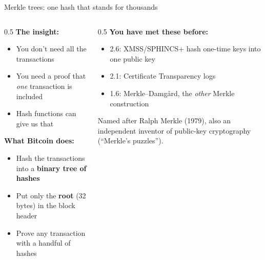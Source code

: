 \ifdefined\PRESENTATION\else\PassOptionsToClass{handout}{beamer}\fi\documentclass[aspectratio=169, lualatex]{beamer}
\begin{document}
\begin{frame}{Merkle trees: one hash that stands for thousands}
	\begin{columns}[c]
		\begin{column}{0.5\textwidth}
			\textbf{The insight:}
			\begin{itemize}
				\item You don't need all the transactions
				\item You need a proof that \emph{one} transaction is included
				\item Hash functions can give us that
			\end{itemize}
			\textbf{What Bitcoin does:}
			\begin{itemize}
				\item Hash the transactions into a \textbf{binary tree of hashes}
				\item Put only the \textbf{root} (32 bytes) in the block header
				\item Prove any transaction with a handful of hashes
			\end{itemize}
		\end{column}
		\begin{column}{0.5\textwidth}
			\textbf{You have met these before:}
			\begin{itemize}
				\item 2.6: XMSS/SPHINCS+ hash one-time keys into one public key
				\item 2.1: Certificate Transparency logs
				\item 1.6: Merkle--Damg\aa rd, the \emph{other} Merkle construction
			\end{itemize}
			\begin{exampleblock}{Named after}
				Ralph Merkle (1979), also an independent inventor of public-key cryptography (``Merkle's puzzles'').
			\end{exampleblock}
		\end{column}
	\end{columns}
\end{frame}
\end{document}
